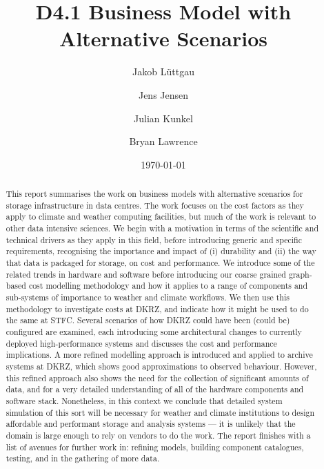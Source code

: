 \documentclass{../../template/esiwace-report}
\title{D4.1 Business Model with Alternative Scenarios}
\author{Jakob Lüttgau
	\and Jens Jensen
	\and Julian Kunkel
	\and Bryan Lawrence
	}
\date{\today} %
\begin{document}
\maketitle
\begin{abstract}

This report summarises the work on business models with alternative scenarios for storage infrastructure in data centres. The work focuses on the cost factors as they apply to climate and weather computing facilities, but much of the work is relevant to other data intensive sciences. We begin with a motivation in terms of the scientific and technical drivers as they apply in this field, before introducing generic and specific requirements, recognising the importance and impact of (i) durability and (ii) the way that data is packaged for storage, on cost and performance. We introduce some of the related trends in hardware and software before introducing our coarse grained graph-based cost modelling methodology and how it applies to a range of components and sub-systems of importance to weather and climate workflows. We then use this methodology to investigate costs at DKRZ, and indicate how it might be used to do the same at STFC.  Several scenarios of how DKRZ could have been (could be) configured are examined, each introducing some architectural changes to currently deployed high-performance systems and discusses the cost and performance implications. A more refined modelling approach is introduced and applied to archive systems at DKRZ, which shows good approximations to observed behaviour. However, this refined approach also shows the need for the collection of significant amounts of data, and for a very detailed understanding of all of the hardware components and software stack. Nonetheless, in this context we conclude that detailed system simulation of this sort will be necessary for weather and climate institutions to design affordable and performant storage and analysis systems --- it is unlikely that the domain is large enough to rely on vendors to do the work. The report finishes with a list of avenues for further work in: refining models, building component catalogues, testing, and in the gathering of more data.
\end{abstract}
\newpage
\tableofcontents
\newpage
\end{document}
